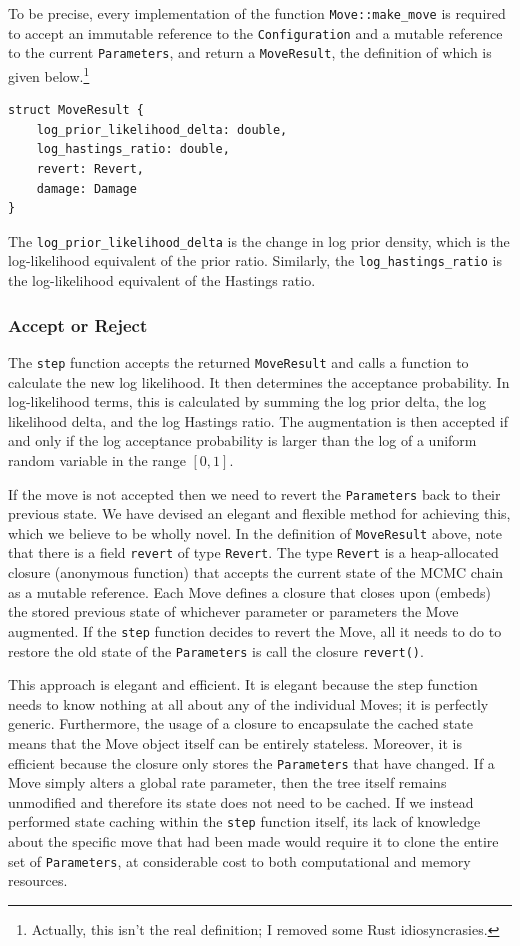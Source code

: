 \documentclass[10pt,journal,compsoc]{IEEEtran}
\begin{document}
To be precise, every implementation of the function \texttt{Move::make\_move} is required to accept an immutable reference to the \texttt{Configuration} and a mutable reference to the current \texttt{Parameters}, and return a \texttt{MoveResult}, the definition of which is given below.\footnote{Actually, this isn't the real definition; I removed some Rust idiosyncrasies.}

\begin{verbatim}
struct MoveResult {
    log_prior_likelihood_delta: double,
    log_hastings_ratio: double,
    revert: Revert,
    damage: Damage
}
\end{verbatim}

The \texttt{log\_prior\_likelihood\_delta} is the change in log prior density, which is the log-likelihood equivalent of the prior ratio. Similarly, the \texttt{log\_hastings\_ratio} is the log-likelihood equivalent of the Hastings ratio.

\subsubsection{Accept or Reject}

The \texttt{step} function accepts the returned \texttt{MoveResult} and calls a function to calculate the new log likelihood. It then determines the acceptance probability. In log-likelihood terms, this is calculated by summing the log prior delta, the log likelihood delta, and the log Hastings ratio. The augmentation is then accepted if and only if the log acceptance probability is larger than the log of a uniform random variable in the range $[0, 1]$.

If the move is not accepted then we need to revert the \texttt{Parameters} back to their previous state. We have devised an elegant and flexible method for achieving this, which we believe to be wholly novel. In the definition of \texttt{MoveResult} above, note that there is a field \texttt{revert} of type \texttt{Revert}. The type \texttt{Revert} is a heap-allocated closure (anonymous function) that accepts the current state of the MCMC chain as a mutable reference. Each Move defines a closure that closes upon (embeds) the stored previous state of whichever parameter or parameters the Move augmented. If the \texttt{step} function decides to revert the Move, all it needs to do to restore the old state of the \texttt{Parameters} is call the closure \texttt{revert()}.

This approach is elegant and efficient. It is elegant because the step function needs to know nothing at all about any of the individual Moves; it is perfectly generic. Furthermore, the usage of a closure to encapsulate the cached state means that the Move object itself can be entirely stateless. Moreover, it is efficient because the closure only stores the \texttt{Parameters} that have changed. If a Move simply alters a global rate parameter, then the tree itself remains unmodified and therefore its state does not need to be cached. If we instead performed state caching within the \texttt{step} function itself, its lack of knowledge about the specific move that had been made would require it to clone the entire set of \texttt{Parameters}, at considerable cost to both computational and memory resources. 
\end{document}
